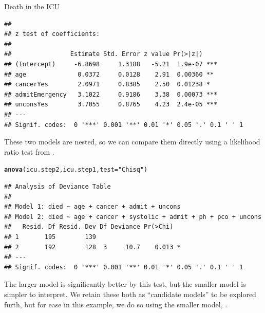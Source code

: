 \documentclass[11pt]{book}\usepackage[]{graphicx}\usepackage[]{color}
\makeatletter
\newcommand{\hlstr}[1]{\textcolor[rgb]{0.192,0.494,0.8}{#1}}%
\newcommand{\hlstd}[1]{\textcolor[rgb]{0.345,0.345,0.345}{#1}}%
\newcommand{\hlkwc}[1]{\textcolor[rgb]{0.333,0.667,0.333}{#1}}%
\newcommand{\hlkwd}[1]{\textcolor[rgb]{0.737,0.353,0.396}{\textbf{#1}}}%
\newenvironment{kframe}{%
 \def\at@end@of@kframe{}%
 \ifinner\ifhmode%
  \def\at@end@of@kframe{\end{minipage}}%
  \begin{minipage}{\columnwidth}%
 \fi\fi%
 \def\FrameCommand##1{\hskip\@totalleftmargin \hskip-\fboxsep
 \colorbox{shadecolor}{##1}\hskip-\fboxsep
     \hskip-\linewidth \hskip-\@totalleftmargin \hskip\columnwidth}%
 \MakeFramed {\advance\hsize-\width
   \@totalleftmargin\z@ \linewidth\hsize
   \@setminipage}}%
 {\par\unskip\endMakeFramed%
 \at@end@of@kframe}
\newenvironment{knitrout}{}{} %
\renewenvironment{knitrout}{\small\renewcommand{\baselinestretch}{.85}}{} %
\makeatother
\begin{document}
\begin{Example}[icu1]{Death in the ICU}
\begin{knitrout}
\begin{kframe}
\begin{verbatim}
## 
## z test of coefficients:
## 
##                Estimate Std. Error z value Pr(>|z|)    
## (Intercept)     -6.8698     1.3188   -5.21  1.9e-07 ***
## age              0.0372     0.0128    2.91  0.00360 ** 
## cancerYes        2.0971     0.8385    2.50  0.01238 *  
## admitEmergency   3.1022     0.9186    3.38  0.00073 ***
## unconsYes        3.7055     0.8765    4.23  2.4e-05 ***
## ---
## Signif. codes:  0 '***' 0.001 '**' 0.01 '*' 0.05 '.' 0.1 ' ' 1
\end{verbatim}
\end{kframe}
\end{knitrout}
These two models are nested, so we can compare them directly using a likelihood ratio
test from .
\begin{knitrout}
\color{fgcolor}\begin{kframe}
\begin{alltt}
\hlkwd{anova}\hlstd{(icu.step2, icu.step1,} \hlkwc{test}\hlstd{=}\hlstr{"Chisq"}\hlstd{)}
\end{alltt}
\begin{verbatim}
## Analysis of Deviance Table
## 
## Model 1: died ~ age + cancer + admit + uncons
## Model 2: died ~ age + cancer + systolic + admit + ph + pco + uncons
##   Resid. Df Resid. Dev Df Deviance Pr(>Chi)  
## 1       195        139                       
## 2       192        128  3     10.7    0.013 *
## ---
## Signif. codes:  0 '***' 0.001 '**' 0.01 '*' 0.05 '.' 0.1 ' ' 1
\end{verbatim}
\end{kframe}
\end{knitrout}
The larger model is significantly better by this test, but the smaller model is 
simpler to interpret. We retain these both as ``candidate models'' to be explored furth,
but for ease in this example, we do so using the smaller model, .


\end{Example}
\end{document}
